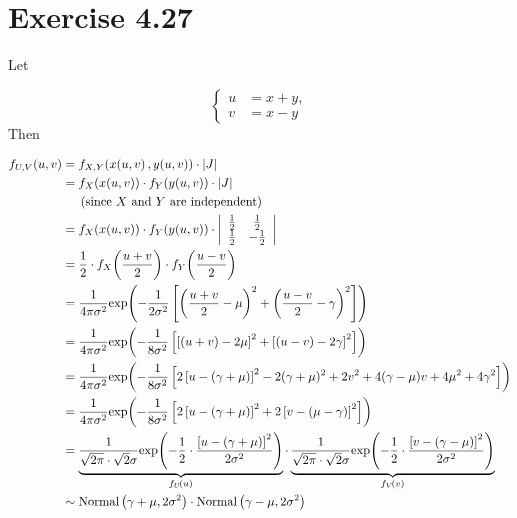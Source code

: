 \documentclass[12pt,letterpaper,reqno]{amsart}
\numberwithin{equation}{subsection}
\begin{document}
\newpage
\section{Exercise 4.27}

Let

\[ \left\{ \begin{array}{cc}
     u &= x+y, \\
     v &= x-y
\end{array} \right. \]
Then

\begin{align*}
    \fun{f_{U,V}}{u,v} &= \fun{f_{X,Y}}{\fun{x}{u,v}, \fun{y}{u,v}} \cdot \Abs{J} \\
    &= \fun{f_X}{x(u,v)} \cdot \fun{f_Y}{y(u,v)} \cdot \Abs{J} \\
    & \ \ \ \ \left(\mbox{since $X$ and $Y$ are independent} \right) \\
    &= \fun{f_X}{x(u,v)} \cdot \fun{f_Y}{y(u,v)} \cdot \Abs{\begin{array}{cc}
         \frac{1}{2}& \frac{1}{2}  \\
         \frac{1}{2}& -\frac{1}{2}
    \end{array}} \\
    &= \frac{1}{2} \cdot \fun{f_X}{\frac{u+v}{2}} \cdot \fun{f_Y}{\frac{u-v}{2}} \\
    &= \frac{1}{4\pi \sigma^2} \fun{\exp}{-\frac{1}{2\sigma^2}\left[ \left( \frac{u+v}{2} - \mu \right)^2 + \left( \frac{u-v}{2} - \gamma \right)^2 \right]} \\
    &= \frac{1}{4\pi \sigma^2} \fun{\exp}{-\frac{1}{8\sigma^2} \left[\left[ (u+v) - 2\mu \right]^2 + \left[ (u-v) - 2\gamma \right]^2 \right]} \\
    &= \frac{1}{4\pi \sigma^2} \fun{\exp}{-\frac{1}{8\sigma^2} \left[ 2 \left[ u - (\gamma + \mu) \right]^2 - 2(\gamma + \mu)^2 + 2v^2 + 4(\gamma - \mu)v + 4\mu^2 + 4 \gamma^2 \right]} \\
    &= \frac{1}{4\pi \sigma^2} \fun{\exp}{-\frac{1}{8\sigma^2} \left[ 2 \left[ u - (\gamma + \mu) \right]^2 + 2 \left[ v - (\mu - \gamma) \right]^2 \right]} \\
    &= \underbrace{\frac{1}{ \sqrt{2\pi} \cdot \sqrt{2}\sigma} \fun{\exp}{- \frac{1}{2} \cdot \frac{\left[ u - ( \gamma + \mu) \right]^2}{2 \sigma^2}}}_{\fun{f_U}{u}} \cdot \underbrace{\frac{1}{ \sqrt{2\pi} \cdot \sqrt{2}\sigma} \fun{\exp}{- \frac{1}{2} \cdot \frac{\left[ v - ( \gamma - \mu) \right]^2}{2 \sigma^2}}}_{\fun{f_V}{v}} \\
    &\sim \normaldist{\gamma + \mu, 2\sigma^2} \cdot \normaldist{\gamma - \mu, 2\sigma^2}
\end{align*}


\newpage
\nocite{*}
\printbibliography
\end{document}
